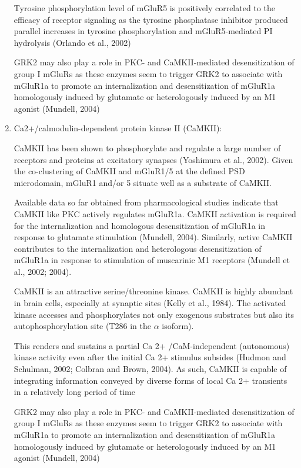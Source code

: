 \begin{enumerate}
Tyrosine phosphorylation level of mGluR5 is positively correlated to the
efficacy of receptor signaling as the tyrosine phosphatase inhibitor produced
parallel increases in tyrosine phosphorylation and mGluR5-mediated PI hydrolysis
(Orlando et al., 2002)

GRK2 may also play a role in PKC- and CaMKII-mediated desensitization of group I mGluRs
as these enzymes seem to trigger GRK2 to associate with mGluR1a to promote an
internalization and desensitization of mGluR1a homologously induced by glutamate or
heterologously induced by an M1 agonist (Mundell, 2004)

  \item Ca2+/calmodulin-dependent protein kinase II (CaMKII):
  
CaMKII has been shown to phosphorylate and regulate a large number of receptors
and proteins at excitatory synapses (Yoshimura et al., 2002).
Given the co-clustering of CaMKII and mGluR1/5 at the defined PSD microdomain,
mGluR1 and/or 5 situate well as a substrate of CaMKII.

Available data so far obtained from pharmacological studies indicate that CaMKII
like PKC actively regulates mGluR1a. CaMKII activation is required for the
internalization and homologous desensitization of mGluR1a in response to
glutamate stimulation (Mundell, 2004). Similarly, active CaMKII contributes to
the internalization and heterologous desensitization of mGluR1a in response to
stimulation of muscarinic M1 receptors (Mundell et al., 2002; 2004).
  
CaMKII is an attractive serine/threonine kinase. CaMKII is highly abundant in brain cells, especially at synaptic
sites (Kelly et al., 1984). 
The activated kinase accesses and phosphorylates not only exogenous
substrates but also its autophosphorylation site (T286 in the 
$\alpha$ isoform). 

This renders and sustains a partial Ca 2+ /CaM-independent (autonomous) kinase
activity even after the initial Ca 2+
 stimulus subsides (Hudmon and Schulman, 2002; Colbran and Brown, 2004). As
 such,
CaMKII is capable of integrating information conveyed by diverse forms of local
Ca 2+ transients in a relatively long period of time

GRK2 may also play a role in PKC- and CaMKII-mediated desensitization of group I mGluRs
as these enzymes seem to trigger GRK2 to associate with mGluR1a to promote an
internalization and desensitization of mGluR1a homologously induced by glutamate or
heterologously induced by an M1 agonist (Mundell, 2004)
  

\end{enumerate}

